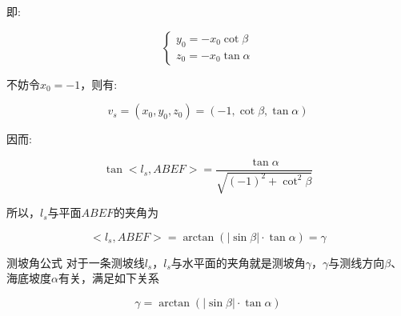 即:

\begin{equation*}
    \begin{cases}
        y_0 = -x_0 \cot \beta \\
        z_0 = -x_0 \tan \alpha
    \end{cases}
\end{equation*}

不妨令$x_0 = -1$，则有:

\begin{equation}
    v_s
    = (x_0, y_0, z_0)
    = \left(
    -1,
    \cot \beta,
    \tan \alpha
    \right)
\end{equation}

因而:

\begin{equation*}
    \tan <l_s, ABEF>
    = \frac {\tan \alpha} {\sqrt{(-1)^2 + \cot ^2 \beta}}
\end{equation*}

所以，$l_s$与平面$ABEF$的夹角为

\begin{equation}
    <l_s, ABEF>
    = \arctan \left(|\sin \beta| \cdot  \tan \alpha\right)
    = \gamma
\end{equation}

\begin{mcmTheorem}{测坡角公式}
    \label{theorem:测坡角公式}
    对于一条测坡线$l_s$，$l_s$与水平面的夹角就是测坡角$\gamma$，$\gamma$与测线方向$\beta$、海底坡度$\alpha$有关，满足如下关系

    \begin{equation}
        \gamma = \arctan(|\sin\beta| \cdot \tan\alpha)
    \end{equation}
\end{mcmTheorem}

